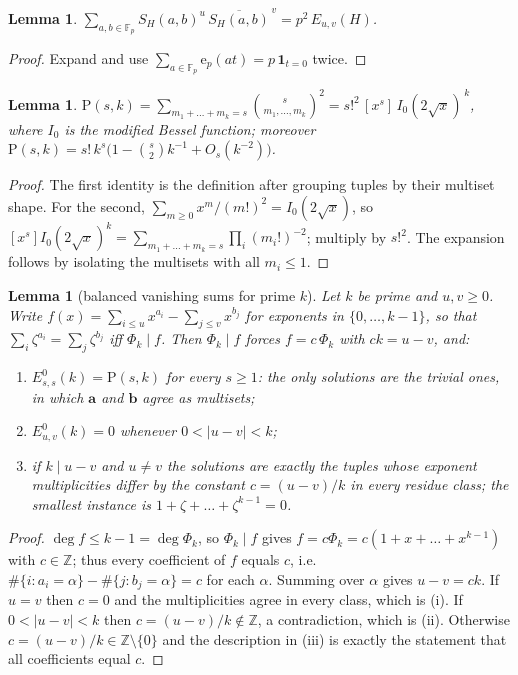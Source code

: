 \documentclass[11pt,reqno]{amsart}
\newtheorem{lemma}[theorem]{Lemma}
\theoremstyle{definition}
\newcommand{\FF}{\mathbb{F}}
\newcommand{\ZZ}{\mathbb{Z}}
\newcommand{\ep}{\mathrm{e}_p}
\begin{document}
\begin{lemma}\label{lem:moment-id}
$\displaystyle\sum_{a,b\in\FF_p}S_H(a,b)^u\,\overline{S_H(a,b)}^{\,v}
 =p^2\,E_{u,v}(H)$.
\end{lemma}
\begin{proof}
Expand and use $\sum_{a\in\FF_p}\ep(at)=p\,\mathbf 1_{t=0}$ twice.
\end{proof}

\begin{lemma}\label{lem:pair}
$\mathrm{P}(s,k)=\sum_{m_1+\dots+m_k=s}\binom{s}{m_1,\dots,m_k}^2
 =s!^2\,[x^s]\,I_0(2\sqrt x)^{\,k}$, where $I_0$ is the modified Bessel
function; moreover $\mathrm{P}(s,k)=s!\,k^s\bigl(1-\binom s2 k^{-1}+O_s(k^{-2})\bigr)$.
\end{lemma}
\begin{proof}
The first identity is the definition after grouping tuples by their multiset
shape. For the second, $\sum_{m\ge0}x^m/(m!)^2=I_0(2\sqrt x)$, so
$[x^s]I_0(2\sqrt x)^k=\sum_{m_1+\dots+m_k=s}\prod_i(m_i!)^{-2}$; multiply by
$s!^2$. The expansion follows by isolating the multisets with all $m_i\le1$.
\end{proof}

\begin{lemma}[balanced vanishing sums for prime $k$]\label{lem:prime-k}
Let $k$ be prime and $u,v\ge0$. Write $f(x)=\sum_{i\le u}x^{a_i}-\sum_{j\le
v}x^{b_j}$ for exponents in $\{0,\dots,k-1\}$, so that
$\sum_i\zeta^{a_i}=\sum_j\zeta^{b_j}$ iff $\Phi_k\mid f$. Then $\Phi_k\mid f$
forces $f=c\,\Phi_k$ with $ck=u-v$, and:
\begin{enumerate}
\item[(i)] $E^0_{s,s}(k)=\mathrm{P}(s,k)$ for every $s\ge1$: the only solutions
  are the trivial ones, in which $\mathbf a$ and $\mathbf b$ agree as multisets;
\item[(ii)] $E^0_{u,v}(k)=0$ whenever $0<|u-v|<k$;
\item[(iii)] if $k\mid u-v$ and $u\neq v$ the solutions are exactly the tuples
  whose exponent multiplicities differ by the constant $c=(u-v)/k$ in every
  residue class; the smallest instance is $1+\zeta+\dots+\zeta^{k-1}=0$.
\end{enumerate}
\end{lemma}
\begin{proof}
$\deg f\le k-1=\deg\Phi_k$, so $\Phi_k\mid f$ gives $f=c\Phi_k=
c(1+x+\dots+x^{k-1})$ with $c\in\ZZ$; thus every coefficient of $f$ equals $c$,
i.e.\ $\#\{i:a_i=\alpha\}-\#\{j:b_j=\alpha\}=c$ for each $\alpha$. Summing over
$\alpha$ gives $u-v=ck$. If $u=v$ then $c=0$ and the multiplicities agree in
every class, which is (i). If $0<|u-v|<k$ then $c=(u-v)/k\notin\ZZ$, a
contradiction, which is (ii). Otherwise $c=(u-v)/k\in\ZZ\setminus\{0\}$ and the
description in (iii) is exactly the statement that all coefficients equal $c$.
\end{proof}
\end{document}
